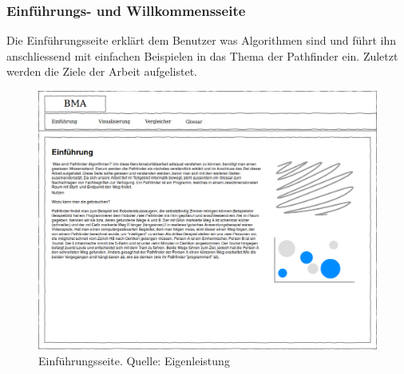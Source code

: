 \documentclass[12pt,a4paper,german]{report}
\begin{document}
\clearpage

\subsubsection{Einführungs- und Willkommensseite}
Die Einführungsseite erklärt dem Benutzer was Algorithmen sind und führt ihn anschliessend mit einfachen Beispielen in das Thema der Pathfinder ein. Zuletzt werden die Ziele der Arbeit aufgelistet.
\begin{figure}[H]
  \centering
  \includegraphics[width=16cm]{einfuehrung1}
  \caption[Konzept der Einführungsseite.]{Einführungsseite. Quelle: Eigenleistung}
  \label{fig:einfuehrung1}
\end{figure}

\clearpage
\end{document}

